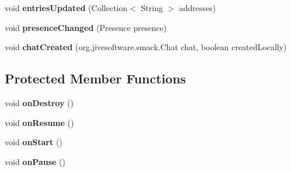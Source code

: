 \begin{DoxyCompactItemize}
\item 
\hypertarget{classat_1_1fhooe_1_1kls_1_1_secure_s_m_s_activity_a8cca8d1f2ff6694919768fbf7cce26ae}{void {\bfseries entries\-Updated} (Collection$<$ String $>$ addresses)}\label{classat_1_1fhooe_1_1kls_1_1_secure_s_m_s_activity_a8cca8d1f2ff6694919768fbf7cce26ae}

\item 
\hypertarget{classat_1_1fhooe_1_1kls_1_1_secure_s_m_s_activity_abbc53b3ecfa91c257bc19aad1d1b6906}{void {\bfseries presence\-Changed} (Presence presence)}\label{classat_1_1fhooe_1_1kls_1_1_secure_s_m_s_activity_abbc53b3ecfa91c257bc19aad1d1b6906}

\item 
\hypertarget{classat_1_1fhooe_1_1kls_1_1_secure_s_m_s_activity_a0e43322052afc3d0e37a54a95c1b6c5b}{void {\bfseries chat\-Created} (org.\-jivesoftware.\-smack.\-Chat chat, boolean created\-Locally)}\label{classat_1_1fhooe_1_1kls_1_1_secure_s_m_s_activity_a0e43322052afc3d0e37a54a95c1b6c5b}

\end{DoxyCompactItemize}
\subsection*{Protected Member Functions}
\begin{DoxyCompactItemize}
\item 
\hypertarget{classat_1_1fhooe_1_1kls_1_1_secure_s_m_s_activity_a1bfafcda6d1ec1aedb31e34adb1e3619}{void {\bfseries on\-Destroy} ()}\label{classat_1_1fhooe_1_1kls_1_1_secure_s_m_s_activity_a1bfafcda6d1ec1aedb31e34adb1e3619}

\item 
\hypertarget{classat_1_1fhooe_1_1kls_1_1_secure_s_m_s_activity_affeab6876b9dea00b4d9e126e889d371}{void {\bfseries on\-Resume} ()}\label{classat_1_1fhooe_1_1kls_1_1_secure_s_m_s_activity_affeab6876b9dea00b4d9e126e889d371}

\item 
\hypertarget{classat_1_1fhooe_1_1kls_1_1_secure_s_m_s_activity_a6f86a8edeeb421591c53b6e0a962e665}{void {\bfseries on\-Start} ()}\label{classat_1_1fhooe_1_1kls_1_1_secure_s_m_s_activity_a6f86a8edeeb421591c53b6e0a962e665}

\item 
\hypertarget{classat_1_1fhooe_1_1kls_1_1_secure_s_m_s_activity_a05d5d82f7e68637cf12e98132913054e}{void {\bfseries on\-Pause} ()}\label{classat_1_1fhooe_1_1kls_1_1_secure_s_m_s_activity_a05d5d82f7e68637cf12e98132913054e}

\end{DoxyCompactItemize}


